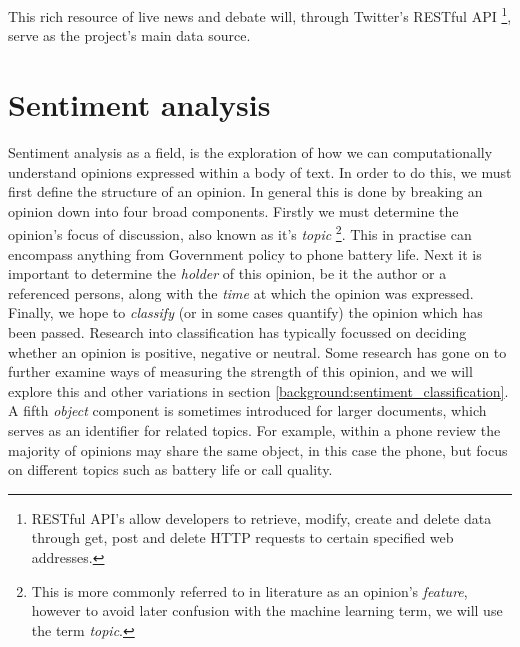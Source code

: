 This rich resource of live news and debate will, through Twitter's RESTful API \footnote{RESTful API's allow developers to retrieve, modify, create and delete data through get, post and delete HTTP requests to certain specified web addresses.}, serve as the project's main data source.

\section{Sentiment analysis}
\label{background:sentiment_analysis}

Sentiment analysis as a field, is the exploration of how we can computationally understand opinions expressed within a body of text. In order to do this, we must first define the structure of an opinion. In general this is done by breaking an opinion down into four broad components. Firstly we must determine the opinion's focus of discussion, also known as it's \emph{topic} \footnote{This is more commonly referred to in literature as an opinion's \emph{feature}, however to avoid later confusion with the machine learning term, we will use the term \emph{topic}.}. This in practise can encompass anything from Government policy to phone battery life. Next it is important to determine the \emph{holder} of this opinion, be it the author or a referenced persons, along with the \emph{time} at which the opinion was expressed. Finally, we hope to \emph{classify} (or in some cases quantify) the opinion which has been passed. Research into classification has typically focussed on deciding whether an opinion is positive, negative or neutral. Some research has gone on to further examine ways of measuring the strength of this opinion, and we will explore this and other variations in section \ref{background:sentiment_classification}. A fifth \emph{object} component is sometimes introduced for larger documents, which serves as an identifier for related topics. For example, within a phone review the majority of opinions may share the same object, in this case the phone, but focus on different topics such as battery life or call quality.


